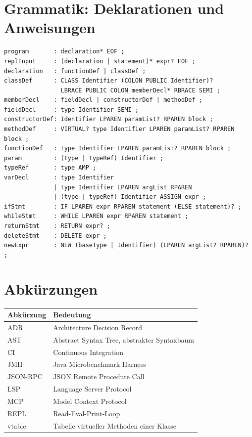 \documentclass[11pt,a4paper,parskip=half,headsepline,toc=flat]{scrartcl}
\newcommand{\code}[1]{\texttt{#1}}
\newcommand{\thead}{\rowcolor{headbg}}
\newcommand{\hcell}[1]{\textbf{\color{navy}#1}}
\newenvironment{reporttable}[1][]%
  {\begin{table}[htbp]\centering\small\renewcommand{\arraystretch}{1.25}\rowcolors{2}{white}{zebra}}%
  {\end{table}}
\begin{document}
\section{Grammatik: Deklarationen und Anweisungen}
\begin{lstlisting}[caption={Parser-Regeln für Deklarationen und Anweisungen (vollständig in \code{MiniCpp.g4})}]
program       : declaration* EOF ;
replInput     : (declaration | statement)* expr? EOF ;
declaration   : functionDef | classDef ;
classDef      : CLASS Identifier (COLON PUBLIC Identifier)?
                LBRACE PUBLIC COLON memberDecl* RBRACE SEMI ;
memberDecl    : fieldDecl | constructorDef | methodDef ;
fieldDecl     : type Identifier SEMI ;
constructorDef: Identifier LPAREN paramList? RPAREN block ;
methodDef     : VIRTUAL? type Identifier LPAREN paramList? RPAREN block ;
functionDef   : type Identifier LPAREN paramList? RPAREN block ;
param         : (type | typeRef) Identifier ;
typeRef       : type AMP ;
varDecl       : type Identifier
              | type Identifier LPAREN argList RPAREN
              | (type | typeRef) Identifier ASSIGN expr ;
ifStmt        : IF LPAREN expr RPAREN statement (ELSE statement)? ;
whileStmt     : WHILE LPAREN expr RPAREN statement ;
returnStmt    : RETURN expr? ;
deleteStmt    : DELETE expr ;
newExpr       : NEW (baseType | Identifier) (LPAREN argList? RPAREN)? ;
\end{lstlisting}

\section{Abkürzungen}
\begin{reporttable}
\begin{tabular}{L{0.2}L{0.72}}
\thead \hcell{Abkürzung} & \hcell{Bedeutung} \\ \midrule
ADR & Architecture Decision Record \\
AST & Abstract Syntax Tree, abstrakter Syntaxbaum \\
CI & Continuous Integration \\
JMH & Java Microbenchmark Harness \\
JSON-RPC & JSON Remote Procedure Call \\
LSP & Language Server Protocol \\
MCP & Model Context Protocol \\
REPL & Read-Eval-Print-Loop \\
vtable & Tabelle virtueller Methoden einer Klasse \\ \bottomrule
\end{tabular}
\end{reporttable}
\end{document}

